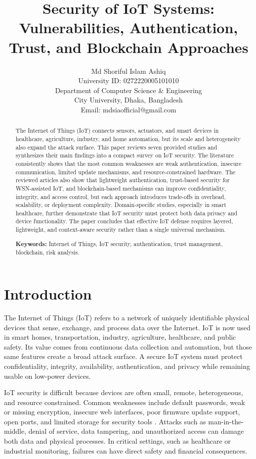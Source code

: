 \documentclass[conference]{IEEEtran}
\title{Security of IoT Systems: Vulnerabilities, Authentication, Trust, and Blockchain Approaches}
\author{
Md Shoriful Islam Ashiq \\
University ID: 0272220005101010 \\
Department of Computer Science \& Engineering \\
City University, Dhaka, Bangladesh \\
Email: mdsiaofficial@gmail.com
}
\begin{document}
\maketitle

\begin{abstract}
The Internet of Things (IoT) connects sensors, actuators, and smart devices in healthcare, agriculture, industry, and home automation, but its scale and heterogeneity also expand the attack surface. This paper reviews seven provided studies and synthesizes their main findings into a compact survey on IoT security. The literature consistently shows that the most common weaknesses are weak authentication, insecure communication, limited update mechanisms, and resource-constrained hardware. The reviewed articles also show that lightweight authentication, trust-based security for WSN-assisted IoT, and blockchain-based mechanisms can improve confidentiality, integrity, and access control, but each approach introduces trade-offs in overhead, scalability, or deployment complexity. Domain-specific studies, especially in smart healthcare, further demonstrate that IoT security must protect both data privacy and device functionality. The paper concludes that effective IoT defense requires layered, lightweight, and context-aware security rather than a single universal mechanism.

\textbf{Keywords:} Internet of Things, IoT security, authentication, trust management, blockchain, risk analysis.
\end{abstract}

\section{Introduction}
The Internet of Things (IoT) refers to a network of uniquely identifiable physical devices that sense, exchange, and process data over the Internet. IoT is now used in smart homes, transportation, industry, agriculture, healthcare, and public safety. Its value comes from continuous data collection and automation, but those same features create a broad attack surface. A secure IoT system must protect confidentiality, integrity, availability, authentication, and privacy while remaining usable on low-power devices.

IoT security is difficult because devices are often small, remote, heterogeneous, and resource constrained. Common weaknesses include default passwords, weak or missing encryption, insecure web interfaces, poor firmware update support, open ports, and limited storage for security tools \cite{dineva}. Attacks such as man-in-the-middle, denial of service, data tampering, and unauthorized access can damage both data and physical processes. In critical settings, such as healthcare or industrial monitoring, failures can have direct safety and financial consequences.
\end{document}
